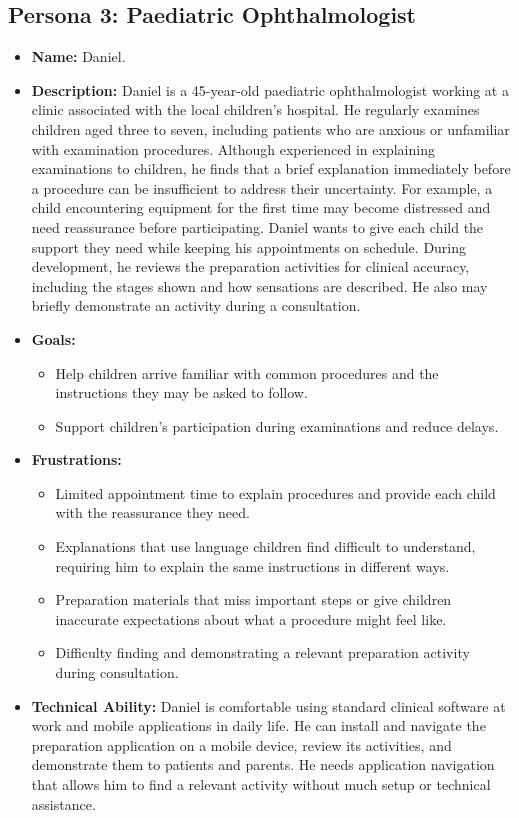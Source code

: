 \documentclass[10pt]{article}
\begin{document}
\subsection{Persona 3: Paediatric Ophthalmologist}
\begin{itemize}
\item \textbf{Name:} Daniel.

\item \textbf{Description:} Daniel is a 45-year-old paediatric ophthalmologist
working at a clinic associated with the local children's hospital. He
regularly examines children aged three to seven, including patients who are
anxious or unfamiliar with examination procedures. Although experienced
in explaining examinations to children, he finds that a brief explanation
immediately before a procedure can be insufficient to address their
uncertainty. For example, a child encountering equipment for the first time may
become distressed and need reassurance before participating. Daniel wants to give
each child the support they need while keeping his appointments on schedule.
During development, he reviews the preparation activities for clinical accuracy, including the
stages shown and how sensations are described. He also may briefly demonstrate an activity during a consultation.

\item \textbf{Goals:}
\begin{itemize}
    \item Help children arrive familiar with common procedures
    and the instructions they may be asked to follow.
    \item Support children's participation during examinations and reduce
    delays.
\end{itemize}

\item \textbf{Frustrations:}
\begin{itemize}
    \item Limited appointment time to explain procedures and
    provide each child with the reassurance they need.
    \item Explanations that use language children find difficult to understand,
    requiring him to explain the same instructions in different ways.
    \item Preparation materials that miss important steps or give children
    inaccurate expectations about what a procedure might feel like.
    \item Difficulty finding and demonstrating a relevant preparation
    activity during consultation.
\end{itemize}

\item \textbf{Technical Ability:} Daniel is comfortable using standard
clinical software at work and mobile applications in daily life. He can 
install and navigate the preparation application on a mobile device, review its activities,
and demonstrate them to patients and parents. He needs application navigation that allows him to find a relevant activity without much
setup or technical assistance.
\end{itemize}
\end{document}
